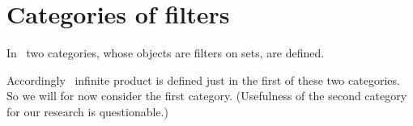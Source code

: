 \chapter{Categories of filters}

In~\cite{filt-cat} two categories, whose objects are filters on sets, are defined.

Accordingly~\cite{filt-cat} infinite product is defined just in the first of these two categories.
So we will for now consider the first category. (Usefulness of the second category for our research is questionable.)